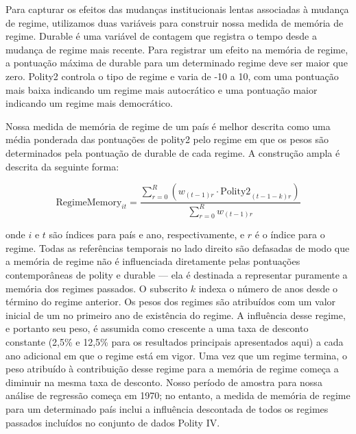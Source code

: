 Para capturar os efeitos das mudanças institucionais lentas associadas à mudança de regime, utilizamos duas variáveis para construir nossa medida de memória de regime. Durable é uma variável de contagem que registra o tempo desde a mudança de regime mais recente. Para registrar um efeito na memória de regime, a pontuação máxima de durable para um determinado regime deve ser maior que zero. Polity2 controla o tipo de regime e varia de -10 a 10, com uma pontuação mais baixa indicando um regime mais autocrático e uma pontuação maior indicando um regime mais democrático.

Nossa medida de memória de regime de um país é melhor descrita como uma média ponderada das pontuações de polity2 pelo regime em que os pesos são determinados pela pontuação de durable de cada regime. A construção ampla é descrita da seguinte forma:

\[
\text{RegimeMemory}_{it} = \frac{\sum_{r=0}^{R} \left( w_{(t-1)r} \cdot \text{Polity2}_{(t-1-k)r} \right)}{\sum_{r=0}^{R} w_{(t-1)r}}
\]

onde $i$ e $t$ são índices para país e ano, respectivamente, e $r$ é o índice para o regime. Todas as referências temporais no lado direito são defasadas de modo que a memória de regime não é influenciada diretamente pelas pontuações contemporâneas de polity e durable — ela é destinada a representar puramente a memória dos regimes passados. O subscrito $k$ indexa o número de anos desde o término do regime anterior. Os pesos dos regimes são atribuídos com um valor inicial de um no primeiro ano de existência do regime. A influência desse regime, e portanto seu peso, é assumida como crescente a uma taxa de desconto constante (2,5\% e 12,5\% para os resultados principais apresentados aqui) a cada ano adicional em que o regime está em vigor. Uma vez que um regime termina, o peso atribuído à contribuição desse regime para a memória de regime começa a diminuir na mesma taxa de desconto. Nosso período de amostra para nossa análise de regressão começa em 1970; no entanto, a medida de memória de regime para um determinado país inclui a influência descontada de todos os regimes passados incluídos no conjunto de dados Polity IV.

